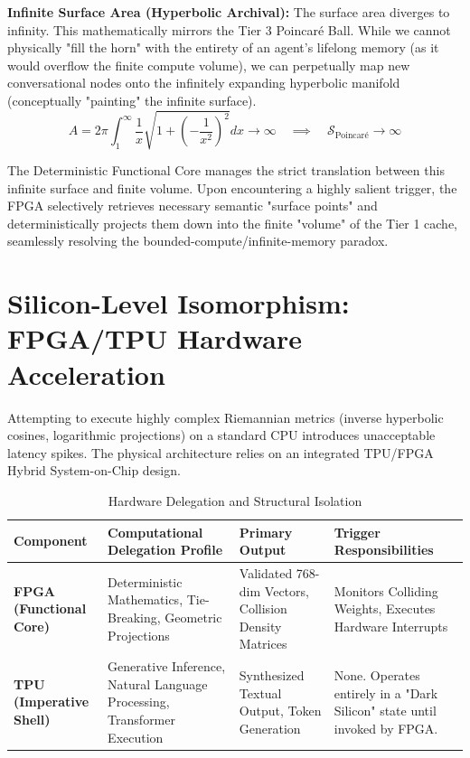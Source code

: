 \documentclass[11pt, a4paper]{article}
\begin{document}
	\textbf{Infinite Surface Area (Hyperbolic Archival):} The surface area diverges to infinity. This mathematically mirrors the Tier 3 Poincaré Ball. While we cannot physically "fill the horn" with the entirety of an agent's lifelong memory (as it would overflow the finite compute volume), we can perpetually map new conversational nodes onto the infinitely expanding hyperbolic manifold (conceptually "painting" the infinite surface).
	\begin{equation}
		A = 2\pi \int_{1}^{\infty} \frac{1}{x} \sqrt{1 + \left(-\frac{1}{x^2}\right)^2} dx \to \infty \quad \implies \quad \mathcal{S}_{\text{Poincar\'e}} \to \infty
	\end{equation}
	
	The Deterministic Functional Core manages the strict translation between this infinite surface and finite volume. Upon encountering a highly salient trigger, the FPGA selectively retrieves necessary semantic "surface points" and deterministically projects them down into the finite "volume" of the Tier 1 cache, seamlessly resolving the bounded-compute/infinite-memory paradox.

	\section{Silicon-Level Isomorphism: FPGA/TPU Hardware Acceleration}
	Attempting to execute highly complex Riemannian metrics (inverse hyperbolic cosines, logarithmic projections) on a standard CPU introduces unacceptable latency spikes. The physical architecture relies on an integrated TPU/FPGA Hybrid System-on-Chip design.
	
    \begin{table}[h]
    \centering
    \caption{Hardware Delegation and Structural Isolation}
    \vspace{0.2cm}
    \begin{tabularx}{\textwidth}{>{\hsize=0.6\hsize\bfseries}X >{\hsize=1.1\hsize}X >{\hsize=1.0\hsize}X >{\hsize=1.3\hsize}X}
    \toprule
    Component & Computational Delegation Profile & Primary Output & Trigger Responsibilities \\
    \midrule
    FPGA (Functional Core) & Deterministic Mathematics, Tie-Breaking, Geometric Projections & Validated 768-dim Vectors, Collision Density Matrices & Monitors Colliding Weights, Executes Hardware Interrupts \\
    \midrule
    TPU (Imperative Shell) & Generative Inference, Natural Language Processing, Transformer Execution & Synthesized Textual Output, Token Generation & None. Operates entirely in a "Dark Silicon" state until invoked by FPGA. \\
    \bottomrule
    \end{tabularx}
    \end{table}
\end{document}
